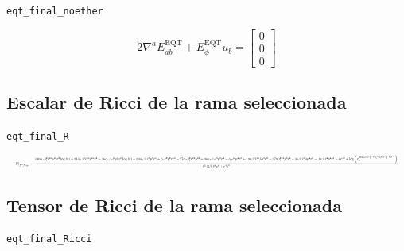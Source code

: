 \documentclass[11pt,a4paper]{article}
\begin{document}
\noindent\texttt{eqt\_final\_noether}\par\nopagebreak[4]

\[
2\nabla^aE^{\mathrm{EQT}}_{ab}+E^{\mathrm{EQT}}_\phi u_b = \left[\begin{matrix}0\\0\\0\end{matrix}\right]
\]

\subsection{Escalar de Ricci de la rama seleccionada}

\noindent\texttt{eqt\_final\_R}\par\nopagebreak[4]

\[
\resizebox{\textwidth}{!}{$\displaystyle R\big|_{f=f_{\mathrm{EQT}}} = \frac{180 \alpha_{1} \beta_{1}^{2} \ell^{10} p^{10} r^{2} \log{\left(r \right)} + 81 \alpha_{1} \beta_{1}^{2} \ell^{10} p^{10} r^{2} - 36 \alpha_{1} \beta_{1} \ell^{6} p^{6} r^{6} \log{\left(r \right)} + 30 \alpha_{1} \beta_{1} \ell^{6} p^{6} r^{6} + \alpha_{1} \ell^{2} p^{2} r^{10} - 27 \alpha_{2} \beta_{1}^{2} \ell^{12} p^{12} + 36 \alpha_{2} \beta_{1} \ell^{8} p^{8} r^{4} - \alpha_{2} \ell^{4} p^{4} r^{8} + 180 \beta_{1}^{2} \ell^{10} \lambda p^{8} r^{2} - 378 \beta_{1}^{2} \ell^{8} p^{8} r^{4} - 36 \beta_{1} \ell^{6} \lambda p^{4} r^{6} - 48 \beta_{1} \ell^{4} p^{4} r^{8} - 6 r^{12} + \log{\left(r_{0}^{36 \alpha_{1} \beta_{1} \ell^{6} p^{6} r^{2} \left(- 5 \beta_{1} \ell^{4} p^{4} + r^{4}\right)} \right)}}{\ell^{2} \left(3 \beta_{1} \ell^{4} p^{4} + r^{4}\right)^{3}}$}
\]

\subsection{Tensor de Ricci de la rama seleccionada}

\noindent\texttt{eqt\_final\_Ricci}\par\nopagebreak[4]
\end{document}
